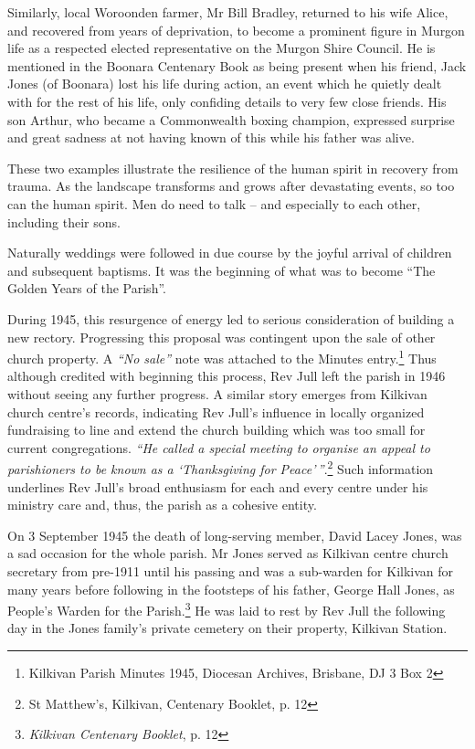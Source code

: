 Similarly, local Woroonden farmer, Mr Bill Bradley, returned to his wife Alice, and recovered from years of deprivation, to become a prominent figure in Murgon life as a respected elected representative on the Murgon Shire Council. He is mentioned in the Boonara Centenary Book as being present when his friend, Jack Jones (of Boonara) lost his life during action, an event which he quietly dealt with for the rest of his life, only confiding details to very few close friends. His son Arthur, who became a Commonwealth boxing champion, expressed surprise and great sadness at not having known of this while his father was alive.



These two examples illustrate the resilience of the human spirit in recovery from trauma. As the landscape transforms and grows after devastating events, so too can the human spirit. Men do need to talk -- and especially to each other, including their sons.



Naturally weddings were followed in due course by the joyful arrival of children and subsequent baptisms. It was the beginning of what was to become ``The Golden Years of the Parish''.



During 1945, this resurgence of energy led to serious consideration of building a new rectory. Progressing this proposal was contingent upon the sale of other church property. A \emph{``No sale''} note was attached to the Minutes entry.\footnote{Kilkivan Parish Minutes 1945, Diocesan Archives, Brisbane, DJ 3 Box 2} Thus although credited with beginning this process, Rev Jull left the parish in 1946 without seeing any further progress. A similar story emerges from Kilkivan church centre's records, indicating Rev Jull's influence in locally organized fundraising to line and extend the church building which was too small for current congregations. \emph{``He called a special meeting to organise an appeal to parishioners to be known as a `Thanksgiving for Peace'\,''}.\footnote{St Matthew's, Kilkivan, Centenary Booklet, p. 12} Such information underlines Rev Jull's broad enthusiasm for each and every centre under his ministry care and, thus, the parish as a cohesive entity.


On 3 September 1945 the death of long-serving member, David Lacey Jones, was a sad occasion for the whole parish. Mr Jones served as Kilkivan centre church secretary from pre-1911 until his passing and was a sub-warden for Kilkivan for many years before following in the footsteps of his father, George Hall Jones, as People's Warden for the Parish.\footnote{\emph{Kilkivan Centenary Booklet}, p. 12} He was laid to rest by Rev Jull the following day in the Jones family's private cemetery on their property, Kilkivan Station.


